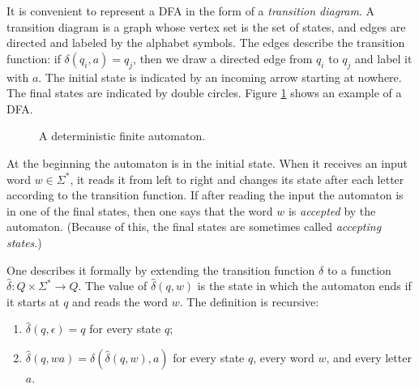 

\setcounter{section}{1}
\setcounter{subsection}{2}
\setcounter{dfn}{1}


It is convenient to represent a DFA in the form of a \emph{transition diagram}.
A transition diagram is a graph whose vertex set is the set of states, and edges are directed and labeled by the alphabet symbols.
The edges describe the transition function: if $\delta(q_i,a) = q_j$, then we draw a directed edge from $q_i$ to $q_j$ and label it with $a$.
The initial state is indicated by an incoming arrow starting at nowhere.
The final states are indicated by double circles.
Figure \ref{fig:DFAOdd} shows an example of a DFA.

\begin{figure}[htb]
\begin{center}

\caption{A deterministic finite automaton.}
\label{fig:DFAOdd}
\end{center}
\end{figure}

At the beginning the automaton is in the initial state.
When it receives an input word $w \in \Sigma^*$, it reads it from left to right and changes its state after each letter according to the transition function.
If after reading the input the automaton is in one of the final states, then one says that the word $w$ is \emph{accepted} by the automaton.
(Because of this, the final states are sometimes called \emph{accepting states}.)

One describes it formally by extending the transition function $\delta$ to a function $\widehat{\delta} \colon Q \times \Sigma^* \to Q$.
The value of $\widehat{\delta}(q,w)$ is the state in which the automaton ends if it starts at $q$ and reads the word $w$.
The definition is recursive:
\begin{enumerate}
\item
$\widehat{\delta}(q, \epsilon) = q$ for every state $q$;
\item
$\widehat{\delta}(q, wa) = \delta(\widehat{\delta}(q,w), a)$ for every state $q$, every word $w$, and every letter $a$.
\end{enumerate}



